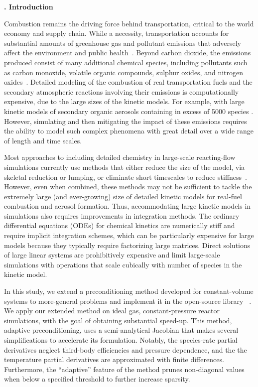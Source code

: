 \documentclass[twocolumn,10pt]{article}
\renewcommand{\section}%
              [1]%
              {%
               \bgroup%
               \flushleft%
               \small\bf%
               \stepcounter{section}%
               \arabic{section}. #1%
               \par%
               \egroup%
              }%
\newcommand{\sectionOne}[1]{\section{#1} \addvspace{10pt}}
\begin{document}
\clearpage

\sectionOne{Introduction}

Combustion remains the driving force behind transportation, critical to the world economy and supply chain.
While a necessity, transportation accounts for substantial amounts of greenhouse gas and pollutant emissions that adversely affect the environment and public health~\cite{van_fan_review_2018, manisalidis_environmental_2020}.
Beyond carbon dioxide, the emissions produced consist of many additional chemical species, including pollutants such as carbon monoxide, volatile organic compounds, sulphur oxides, and nitrogen oxides~\cite{van_fan_review_2018}.
Detailed modeling of the combustion of real transportation fuels and the secondary atmospheric reactions involving their emissions is computationally expensive, due to the large sizes of the kinetic models.
For example, with large kinetic models of secondary organic aerosols containing in excess of 5000 species \cite{li_modeling_2015}.
However, simulating and then mitigating the impact of these emissions requires the ability to model such complex phenomena with great detail over a wide range of length and time scales.

Most approaches to including detailed chemistry in large-scale reacting-flow simulations currently use methods that either reduce the size of the model, via skeletal reduction or lumping, or eliminate short timescales to reduce stiffness~\cite{Lu2009, Pepiot2019}.
However, even when combined, these methods may not be sufficient to tackle the extremely large (and ever-growing) size of detailed kinetic models for real-fuel combustion and aerosol formation.
Thus, accommodating large kinetic models in simulations also requires improvements in integration methods.
The ordinary differential equations (ODEs) for chemical kinetics are numerically stiff and require implicit integration schemes, which can be particularly expensive for large models because they typically require factorizing large matrices.
Direct solutions of large linear systems are prohibitively expensive and limit large-scale simulations with operations that scale cubically with number of species in the kinetic model.

In this study, we extend a preconditioning method developed for constant-volume systems \cite{mcnenly_faster_2015} to more-general problems and implement it in the open-source library \cantera{}~\cite{cantera}.
We apply our extended method on ideal gas, constant-pressure reactor simulations, with the goal of obtaining substantial speed-up.
This method, adaptive preconditioning, uses a semi-analytical Jacobian that makes several simplifications to accelerate its formulation.
Notably, the species-rate partial derivatives neglect third-body efficiencies and pressure dependence, and the
the temperature partial derivatives are approximated with finite differences.
Furthermore, the ``adaptive'' feature of the method prunes non-diagonal values when below a specified threshold to further increase sparsity.
\end{document}
